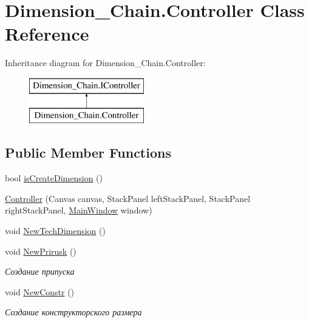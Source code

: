 \hypertarget{class_dimension___chain_1_1_controller}{}\section{Dimension\+\_\+\+Chain.\+Controller Class Reference}
\label{class_dimension___chain_1_1_controller}
Inheritance diagram for Dimension\+\_\+\+Chain.\+Controller\+:\begin{figure}[H]
\begin{center}
\leavevmode
\includegraphics[height=2.000000cm]{class_dimension___chain_1_1_controller}
\end{center}
\end{figure}
\subsection*{Public Member Functions}
\begin{DoxyCompactItemize}
\item 
bool \mbox{\hyperlink{class_dimension___chain_1_1_controller_ae8c6a98ffe1507c958ca65e93d533c87}{is\+Create\+Dimension}} ()
\item 
\mbox{\hyperlink{class_dimension___chain_1_1_controller_a74201e6ac926c9d9028d0f465f037704}{Controller}} (Canvas canvas, Stack\+Panel left\+Stack\+Panel, Stack\+Panel right\+Stack\+Panel, \mbox{\hyperlink{class_dimension___chain_1_1_main_window}{Main\+Window}} window)
\item 
void \mbox{\hyperlink{class_dimension___chain_1_1_controller_a9e7eca33518de3a62888f2a6272cdeb6}{New\+Tech\+Dimension}} ()
\item 
void \mbox{\hyperlink{class_dimension___chain_1_1_controller_a5c809db2364ca8fd973b737cee2659b3}{New\+Prirusk}} ()
\begin{DoxyCompactList}\small\item\em Создание припуска \end{DoxyCompactList}\item 
void \mbox{\hyperlink{class_dimension___chain_1_1_controller_ac398246345f2b29698291b468aa0f491}{New\+Constr}} ()
\begin{DoxyCompactList}\small\item\em Создание конструкторского размера \end{DoxyCompactList}\end{DoxyCompactItemize}
